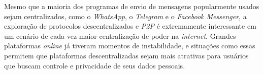Mesmo que a maioria dos programas de envio de mensagens popularmente usados sejam centralizados, como o \textit{WhatsApp}, o \textit{Telegram} e o \textit{Facebook Messenger}, a exploração de protocolos descentralizados e \textit{P2P} é extremamente interessante em um cenário de cada vez maior centralização de poder na \textit{internet}. Grandes plataformas \textit{online} já tiveram momentos de instabilidade, e situações como essas permitem que plataformas descentralizadas sejam mais atrativas para usuários que buscam controle e privacidade de seus dados pessoais.